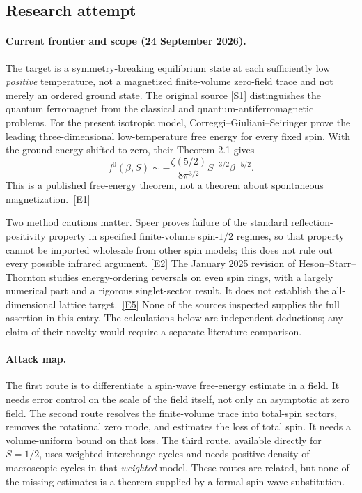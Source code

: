 \documentclass[11pt]{article}
\newcommand{\sref}[2]{\hyperlink{source:#1:#2}{[S#2]}}
\newcommand{\eref}[2]{\hyperlink{extra:#1:#2}{[E#2]}}
\begin{document}
	\subsection{Research attempt}
	
	\paragraph{Current frontier and scope (24 September 2026).}
	The target is a symmetry-breaking equilibrium state at each sufficiently
	low \emph{positive} temperature, not a magnetized finite-volume zero-field
	trace and not merely an ordered ground state. The original source
	\sref{202}{1} distinguishes the quantum ferromagnet from the classical
	and quantum-antiferromagnetic problems. For the present isotropic model,
	Correggi--Giuliani--Seiringer prove the leading three-dimensional
	low-temperature free energy for every fixed spin. With the ground
	energy shifted to zero, their Theorem 2.1 gives
	\[
	f^0(\beta,S)\sim
	-\frac{\zeta(5/2)}{8\pi^{3/2}}S^{-3/2}\beta^{-5/2}.
	\]
	This is a published free-energy theorem, not a theorem about spontaneous
	magnetization.\ \eref{202}{1}
	
	Two method cautions matter. Speer proves failure of the standard
	reflection-positivity property in specified finite-volume spin-$1/2$
	regimes, so that property cannot be imported wholesale from other spin
	models; this does not rule out every possible infrared argument.
	\eref{202}{2} The January 2025 revision of Heson--Starr--Thornton studies
	energy-ordering reversals on even spin rings, with a largely numerical
	part and a rigorous singlet-sector result. It does not establish the
	all-dimensional lattice target.\ \eref{202}{5}
	None of the sources inspected supplies the full assertion in this entry.
	The calculations below are independent deductions; any claim of their
	novelty would require a separate literature comparison.
	
	\paragraph{Attack map.}
	The first route is to differentiate a spin-wave free-energy estimate in
	a field. It needs error control on the scale of the field itself, not
	only an asymptotic at zero field. The second route resolves the
	finite-volume trace into total-spin sectors, removes the rotational
	zero mode, and estimates the loss of total spin. It needs a
	volume-uniform bound on that loss. The third route, available directly
	for $S=1/2$, uses weighted interchange cycles and needs positive density
	of macroscopic cycles in that \emph{weighted} model. These routes are
	related, but none of the missing estimates is a theorem supplied by a
	formal spin-wave substitution.
	
\end{document}
